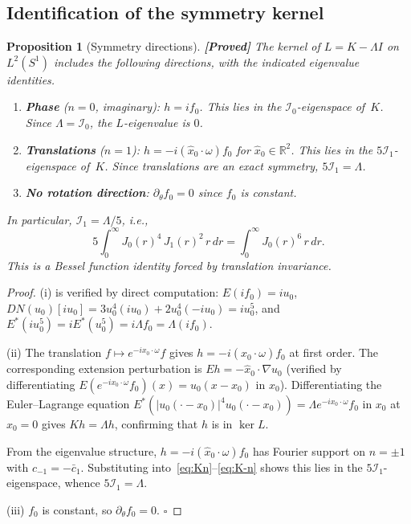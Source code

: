 \documentclass[12pt]{article}
\newtheorem{proposition}[theorem]{Proposition}
\theoremstyle{definition}
\theoremstyle{remark}
\newcommand{\R}{\mathbb{R}}
\newcommand{\proven}{\textbf{\color{teal}[Proved]}}
\begin{document}
\subsection{Identification of the symmetry kernel}

\begin{proposition}[Symmetry directions]
  \label{prop:symmetry-kernel}
  \proven\quad
  The kernel of $L=K-\Lambda I$ on $L^2(S^1)$ includes the following
  directions, with the indicated eigenvalue identities.
  \begin{enumerate}[leftmargin=2em]
    \item \textbf{Phase} ($n=0$, imaginary):
      $h=if_0$.  This lies in the $\mathcal I_0$-eigenspace of~$K$.
      Since $\Lambda=\mathcal I_0$, the $L$-eigenvalue is $0$.
    \item \textbf{Translations} ($n=1$):
      $h=-i(\hat x_0\cdot\omega)f_0$ for $\hat x_0\in\R^2$.
      This lies in the $5\mathcal I_1$-eigenspace of~$K$.
      Since translations are an exact symmetry, $5\mathcal I_1=\Lambda$.
    \item \textbf{No rotation direction}:
      $\partial_\theta f_0=0$ since $f_0$ is constant.
  \end{enumerate}
  In particular, $\mathcal I_1=\Lambda/5$, i.e.,
  \begin{equation}  \label{eq:bessel-identity}
    5\int_0^\infty J_0(r)^4\,J_1(r)^2\,r\,dr
    = \int_0^\infty J_0(r)^6\,r\,dr.
  \end{equation}
  This is a Bessel function identity forced by translation invariance.
\end{proposition}

\begin{proof}
  (i) is verified by direct computation: $E(if_0)=iu_0$,
  $DN(u_0)[iu_0]=3u_0^4(iu_0)+2u_0^4(-iu_0)=iu_0^5$, and
  $E^*(iu_0^5)=iE^*(u_0^5)=i\Lambda f_0=\Lambda(if_0)$.

  (ii) The translation $f\mapsto e^{-ix_0\cdot\omega}f$ gives
  $h=-i(\hat x_0\cdot\omega)f_0$ at first order.  The corresponding
  extension perturbation is $Eh=-\hat x_0\cdot\nabla u_0$
  (verified by differentiating $E(e^{-ix_0\cdot\omega}f_0)(x)=u_0(x-x_0)$
  in $x_0$).  Differentiating the Euler--Lagrange equation
  $E^*(|u_0(\cdot-x_0)|^4 u_0(\cdot-x_0))=\Lambda e^{-ix_0\cdot\omega}f_0$
  in $x_0$ at $x_0=0$ gives $Kh=\Lambda h$, confirming that $h$ is in
  $\ker L$.

  From the eigenvalue structure, $h=-i(\hat x_0\cdot\omega)f_0$ has
  Fourier support on $n=\pm 1$ with $c_{-1}=-\bar c_1$.  Substituting
  into~\eqref{eq:Kn}--\eqref{eq:K-n} shows this lies in the
  $5\mathcal I_1$-eigenspace, whence $5\mathcal I_1=\Lambda$.

  (iii) $f_0$ is constant, so $\partial_\theta f_0=0$. $\square$
\end{proof}
\end{document}
